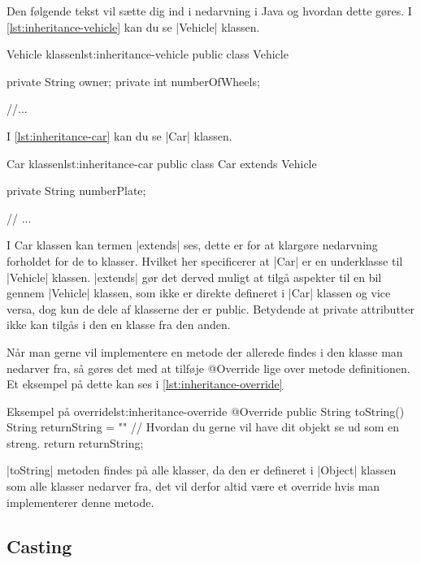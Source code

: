 Den følgende tekst vil sætte dig ind i nedarvning i Java og hvordan
dette gøres. I \autoref{lst:inheritance-vehicle} kan du se
\JavaInline|Vehicle| klassen.

\begin{JavaCode}{Vehicle klassen}{lst:inheritance-vehicle}
	public class Vehicle {

		private String owner;
		private int numberOfWheels;

		//...
	}
\end{JavaCode}

I \autoref{lst:inheritance-car} kan du se \JavaInline|Car| klassen.

\begin{JavaCode}{Car klassen}{lst:inheritance-car}
	public class Car extends Vehicle {

		private String numberPlate;

		// ...
	}
\end{JavaCode}

I Car klassen kan termen \JavaInline|extends| ses, dette er for at
klargøre nedarvning forholdet for de to klasser. Hvilket her
specificerer at \JavaInline|Car| er en underklasse til
\JavaInline|Vehicle| klassen. \JavaInline|extends| gør det derved
muligt at tilgå aspekter til en bil gennem \JavaInline|Vehicle|
klassen, som ikke er direkte defineret i \JavaInline|Car| klassen og
vice versa, dog kun de dele af klasserne der er public. Betydende at
private attributter ikke kan tilgås i den en klasse fra den anden.

Når man gerne vil implementere en metode der allerede findes i den
klasse man nedarver fra, så gøres det med at tilføje @Override lige
over metode definitionen. Et eksempel på dette kan ses i
\autoref{lst:inheritance-override}

\begin{JavaCode}{Eksempel på override}{lst:inheritance-override}
	@Override
	public String toString() {
		String returnString = ""   // Hvordan du gerne vil have dit objekt se ud som en streng.
		return returnString;
	}
\end{JavaCode}

\JavaInline|toString| metoden findes på alle klasser, da den er
defineret i \JavaInline|Object| klassen som alle klasser nedarver fra,
det vil derfor altid være et override hvis man implementerer denne
metode.






\subsection{Casting}

